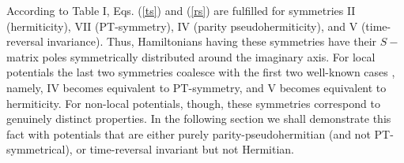 According to Table I,  Eqs. (\ref{ts}) and (\ref{rs}) are fulfilled
for symmetries  II (hermiticity), VII (PT-symmetry), IV (parity pseudohermiticity),
and V (time-reversal invariance). Thus, Hamiltonians having these symmetries have their $S-$matrix poles symmetrically distributed around the imaginary axis. For local potentials the last two symmetries coalesce with the first two well-known
cases \cite{Ruschhaupt2017}, namely,
IV becomes equivalent to PT-symmetry, and V becomes equivalent to hermiticity. For non-local potentials, though, these symmetries
correspond to genuinely distinct properties. In the following section we shall demonstrate this fact with potentials that are
either purely parity-pseudohermitian (and not PT-symmetrical), or time-reversal invariant but not Hermitian.

%
%
%
%
%
%
%
